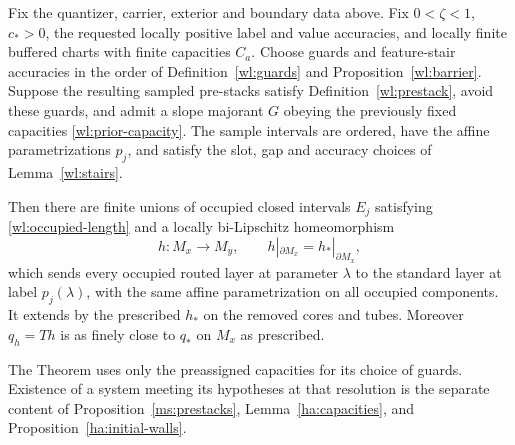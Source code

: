 \begin{theorem}\label{wl:realization}
Fix the quantizer, carrier, exterior and boundary data above.  Fix
$0<\zeta<1$, $c_*>0$, the requested locally positive label and value
accuracies, and locally finite buffered charts with finite
capacities $C_a$.  Choose guards and feature-stair accuracies in the
order of Definition~\ref{wl:guards} and
Proposition~\ref{wl:barrier}.  Suppose the resulting sampled
pre-stacks satisfy Definition~\ref{wl:prestack}, avoid these guards,
and admit a slope majorant $G$ obeying the previously fixed
capacities \eqref{wl:prior-capacity}.  The sample intervals are
ordered, have the affine parametrizations $p_j$, and satisfy the
slot, gap and accuracy choices of Lemma~\ref{wl:stairs}.

Then there are finite unions of occupied closed intervals $E_j$
satisfying \eqref{wl:occupied-length} and a locally bi-Lipschitz
homeomorphism
\[
 h:M_x\longrightarrow M_y,\qquad h|_{\partial M_x}=h_*|_{\partial M_x},
\]
which sends every occupied routed layer at parameter $\lambda$ to
the standard layer at label $p_j(\lambda)$, with the same affine
parametrization on all occupied components.  It extends by the
prescribed $h_*$ on the removed cores and tubes.  Moreover
$q_h=Th$ is as finely close to $q_*$ on $M_x$ as prescribed.

The Theorem uses only the preassigned capacities for its choice of
guards.  Existence of a system meeting its hypotheses at that
resolution is the separate content of
Proposition~\ref{ms:prestacks}, Lemma~\ref{ha:capacities}, and
Proposition~\ref{ha:initial-walls}.
\end{theorem}

